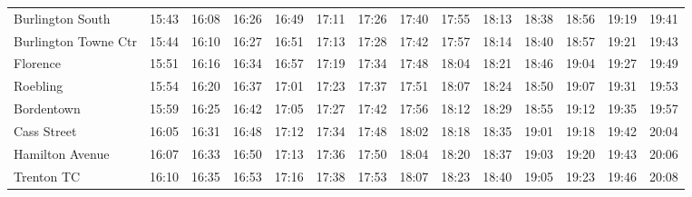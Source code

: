 \begin{center}
\begin{tabular}{@{}lrrrrrrrrrrrrr@{}}
Burlington South & 15:43 & 16:08 & 16:26 & 16:49 & 17:11 & 17:26 & 17:40 & 17:55 & 18:13 & 18:38 & 18:56 & 19:19 & 19:41 \\
Burlington Towne Ctr & 15:44 & 16:10 & 16:27 & 16:51 & 17:13 & 17:28 & 17:42 & 17:57 & 18:14 & 18:40 & 18:57 & 19:21 & 19:43 \\
Florence & 15:51 & 16:16 & 16:34 & 16:57 & 17:19 & 17:34 & 17:48 & 18:04 & 18:21 & 18:46 & 19:04 & 19:27 & 19:49 \\
Roebling & 15:54 & 16:20 & 16:37 & 17:01 & 17:23 & 17:37 & 17:51 & 18:07 & 18:24 & 18:50 & 19:07 & 19:31 & 19:53 \\
Bordentown & 15:59 & 16:25 & 16:42 & 17:05 & 17:27 & 17:42 & 17:56 & 18:12 & 18:29 & 18:55 & 19:12 & 19:35 & 19:57 \\
Cass Street & 16:05 & 16:31 & 16:48 & 17:12 & 17:34 & 17:48 & 18:02 & 18:18 & 18:35 & 19:01 & 19:18 & 19:42 & 20:04 \\
Hamilton Avenue & 16:07 & 16:33 & 16:50 & 17:13 & 17:36 & 17:50 & 18:04 & 18:20 & 18:37 & 19:03 & 19:20 & 19:43 & 20:06 \\
Trenton TC & 16:10 & 16:35 & 16:53 & 17:16 & 17:38 & 17:53 & 18:07 & 18:23 & 18:40 & 19:05 & 19:23 & 19:46 & 20:08 \\
\bottomrule\end{tabular}\end{center}
